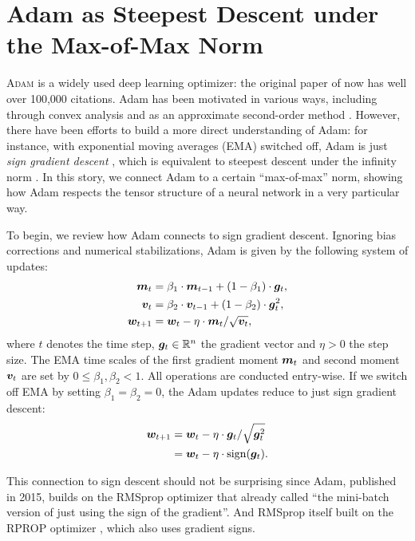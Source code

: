\section{Adam as Steepest Descent under the Max-of-Max Norm}
\label{sec:adam}

\lettrine{A}{dam} is a widely used deep learning optimizer: the original paper of \citet{kingma_adam:_2015} now has well over 100,000 citations. Adam has been motivated in various ways, including through convex analysis \citep{kingma_adam:_2015} and as an approximate second-order method \citep{sun-and-spall}. However, there have been efforts to build a more direct understanding of Adam: for instance, with exponential moving averages (EMA) switched off, Adam is just \textit{sign gradient descent} \citep{pmlr-v80-balles18a,signum}, which is equivalent to steepest descent under the infinity norm \citep{spectral-descent-2}. In this story, we connect Adam to a certain ``max-of-max'' norm, showing how Adam respects the tensor structure of a neural network in a very particular way.

To begin, we review how Adam connects to sign gradient descent. Ignoring bias corrections and numerical stabilizations, Adam is given by the following system of updates:
\begin{align}
    {\bm{m}}_t &= \beta_1 \cdot {\bm{m}}_{t-1} + (1 - \beta_1) \cdot {\bm{g}}_t, \\
    {\bm{v}}_t &= \beta_2 \cdot {\bm{v}}_{t-1} + (1 - \beta_2) \cdot {\bm{g}}_t^2, \\
    {\bm{w}}_{t+1} &= {\bm{w}}_t - \eta \cdot {\bm{m}}_t / \sqrt{{\bm{v}}_t},
\end{align}
where $t$ denotes the time step, ${\bm{g}}_t \in \mathbb{R}^n$ the gradient vector and $\eta > 0$ the step size. The EMA time scales of the first gradient moment ${\bm{m}}_t$ and second moment ${\bm{v}}_t$ are set by $0 \leq \beta_1, \beta_2 < 1$. All operations are conducted entry-wise. If we switch off EMA by setting $\beta_1 = \beta_2 = 0$, the Adam updates reduce to just sign gradient descent:
\begin{align}
    {\bm{w}}_{t+1} &= {\bm{w}}_t - \eta \cdot {\bm{g}}_t / \sqrt{{\bm{g}}_t^{2}} \label{eq:funky-adam} \\
    &= {\bm{w}}_t - \eta \cdot \operatorname{sign}({\bm{g}}_t) \label{eq:sign-adam}.
\end{align}

This connection to sign descent should not be surprising since Adam, published in 2015, builds on the RMSprop optimizer that \citet{tieleman_rmsprop_2012} already called ``the mini-batch version of just using the sign of the gradient''. And RMSprop itself built on the RPROP optimizer \citep{rprop}, which also uses gradient signs.

